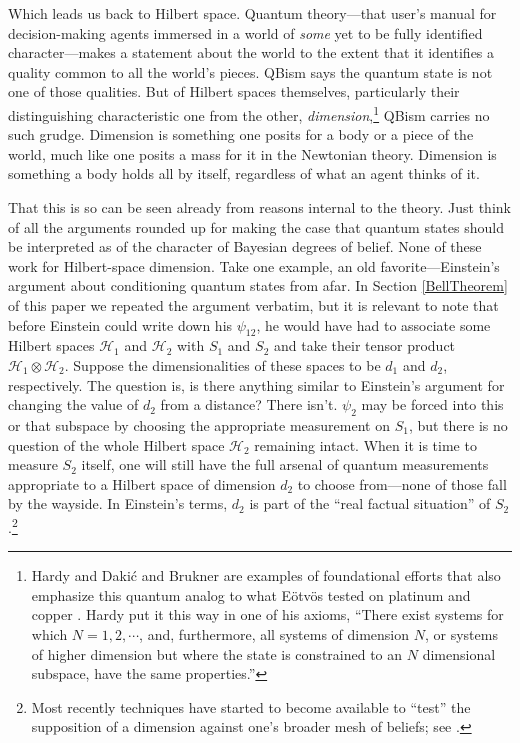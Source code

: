 Which leads us back to Hilbert space.  Quantum theory---that user's manual for decision-making agents immersed in a world of {\it some\/} yet to be fully identified character---makes a statement about the world to the extent that it identifies a quality common to all the world's pieces.  QBism says the quantum state is not one of those qualities.  But of Hilbert spaces themselves, particularly their distinguishing characteristic one from the other, {\it dimension},\footnote{Hardy \cite{Hardy01a,Hardy01b} and Daki\'c and Brukner \cite{Dakic09} are examples of foundational efforts that also emphasize this quantum analog to what E\"otv\"os tested on platinum and copper \cite{Fuchs04b}.  Hardy put it this way in one of his axioms, ``There exist systems for which $N = 1, 2, \cdots$, and, furthermore, all systems of dimension $N$, or systems of higher dimension but where the state is constrained to an $N$ dimensional subspace, have the same properties.''} QBism car\-ries no such grudge.  Dimension is something one posits for a body or a piece of the world, much like one posits a mass for it in the Newtonian theory.  Dimension is something a body holds all by itself, regardless of what an agent thinks of it.

That this is so can be seen already from reasons internal to the theory.  Just think of all the arguments rounded up for making the case that quantum states should be interpreted as of the character of Bayesian degrees of belief.  None of these work for Hilbert-space dimension.  Take one example, an old favorite---Einstein's argument about conditioning quantum states from afar.  In Section \ref{BellTheorem} of this paper we repeated the argument verbatim, but it is relevant to note that before Einstein could write down his $\psi_{12}$, he would have had to associate some Hilbert spaces ${\mathcal H}_1$ and ${\mathcal H}_2$ with $S_1$ and $S_2$ and take their tensor product ${\mathcal H}_1\otimes{\mathcal H}_2$.  Suppose the dimensionalities of these spaces to be $d_1$ and $d_2$, respectively.  The question is, is there anything similar to Einstein's argument for changing the value of $d_2$ from a distance?  There isn't.  $\psi_2$ may be forced into this or that subspace by choosing the appropriate measurement on $S_1$, but there is no question of the whole Hilbert space ${\mathcal H}_2$ remaining intact.  When it is time to measure $S_2$ itself, one will still have the full arsenal of quantum measurements appropriate to a Hilbert space of dimension $d_2$ to choose from---none of those fall by the wayside.  In Einstein's terms, $d_2$ is part of the ``real factual situation'' of $S_2$.\footnote{Most recently techniques have started to become available to ``test'' the supposition of a dimension against one's broader mesh of beliefs; see \cite{Brunner08,Wehner08,Wolf09}.}

